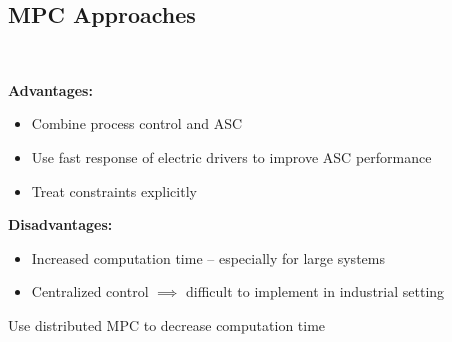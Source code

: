 \subsection{MPC Approaches}
\begin{frame}{~}

  {\bfseries Advantages:\\}
  \begin{itemize}
    \item Combine process control and ASC
    \item Use fast response of electric drivers to improve ASC performance
    \item Treat constraints explicitly
  \end{itemize}
  \vspace{1em}
  {\bfseries Disadvantages:\\}
  \begin{itemize}
    \item Increased computation time -- especially for large systems
    \item Centralized control $\implies$ difficult to implement in industrial setting
  \end{itemize}
  \vspace{1em}

  \pause

  {\centering
    \alert{Use distributed MPC to decrease computation time}\\
  }

\end{frame}

\printsectiontitlefalse
\printsectiontitletrue

